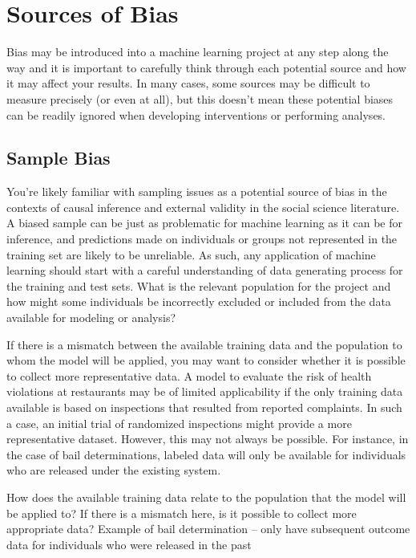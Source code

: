\documentclass[]{krantz}
\begin{document}
\hypertarget{sec:biassources}{\section{Sources of
Bias}\label{sec:biassources}}

Bias may be introduced into a machine learning project at any step along
the way and it is important to carefully think through each potential
source and how it may affect your results. In many cases, some sources
may be difficult to measure precisely (or even at all), but this doesn't
mean these potential biases can be readily ignored when developing
interventions or performing analyses.

\subsection{Sample Bias}\label{sample-bias}

You're likely familiar with sampling issues as a potential source of
bias in the contexts of causal inference and external validity in the
social science literature. A biased sample can be just as problematic
for machine learning as it can be for inference, and predictions made on
individuals or groups not represented in the training set are likely to
be unreliable. As such, any application of machine learning should start
with a careful understanding of data generating process for the training
and test sets. What is the relevant population for the project and how
might some individuals be incorrectly excluded or included from the data
available for modeling or analysis?

If there is a mismatch between the available training data and the
population to whom the model will be applied, you may want to consider
whether it is possible to collect more representative data. A model to
evaluate the risk of health violations at restaurants may be of limited
applicability if the only training data available is based on
inspections that resulted from reported complaints. In such a case, an
initial trial of randomized inspections might provide a more
representative dataset. However, this may not always be possible. For
instance, in the case of bail determinations, labeled data will only be
available for individuals who are released under the existing system.

How does the available training data relate to the population that the
model will be applied to? If there is a mismatch here, is it possible to
collect more appropriate data? Example of bail determination -- only
have subsequent outcome data for individuals who were released in the
past
\end{document}
